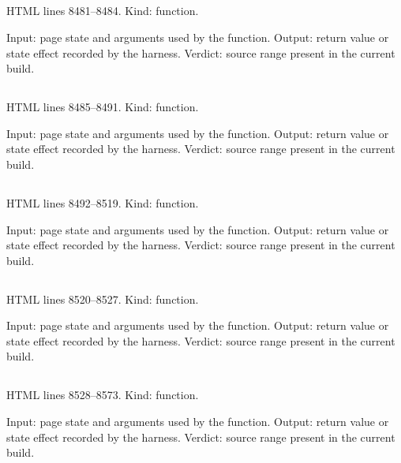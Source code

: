 \subsection*{\texttt{}}
\label{vf_461_metadataId}
HTML lines 8481--8484. Kind: function.

Input: page state and arguments used by the function.
Output: return value or state effect recorded by the harness.
Verdict: source range present in the current build.

\subsection*{\texttt{}}
\label{vf_462_outputDistribution}
HTML lines 8485--8491. Kind: function.

Input: page state and arguments used by the function.
Output: return value or state effect recorded by the harness.
Verdict: source range present in the current build.

\subsection*{\texttt{}}
\label{vf_463_distributionsFor}
HTML lines 8492--8519. Kind: function.

Input: page state and arguments used by the function.
Output: return value or state effect recorded by the harness.
Verdict: source range present in the current build.

\subsection*{\texttt{}}
\label{vf_464_variablesFor}
HTML lines 8520--8527. Kind: function.

Input: page state and arguments used by the function.
Output: return value or state effect recorded by the harness.
Verdict: source range present in the current build.

\subsection*{\texttt{}}
\label{vf_465_datasetMetadata}
HTML lines 8528--8573. Kind: function.

Input: page state and arguments used by the function.
Output: return value or state effect recorded by the harness.
Verdict: source range present in the current build.

